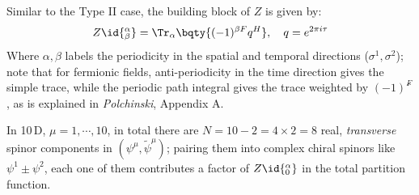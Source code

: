 \documentclass[a4paper,10pt]{article}
\begin{document}
\begin{enumerate}
\begin{enumerate}
	Similar to the Type II case, the building block of $Z$ is given by:
	\begin{equation}
		Z\id{^\alpha_\beta}
		= \Tr_\alpha \bqty{
				(-1)^{\beta F} q^H
			},\quad
		q = e^{2\pi i\tau}
	\end{equation}
	Where $\alpha,\beta$ labels the periodicity in the spatial and temporal directions ($\sigma^1,\sigma^2$); note that for fermionic fields, anti-periodicity in the time direction gives the simple trace, while the periodic path integral gives the trace weighted by $(−1)^F̂$, as is explained in \textit{Polchinski}, Appendix A. 
	
	In 10\,D, $\mu = 1,\cdots,10$, in total there are $
		N = 10 - 2 = 4\times 2 = 8
	$ real, \textit{transverse} spinor components in $(\psi^\mu,\tilde{\psi}^\mu)$; pairing them into complex chiral spinors like $\psi^1 \pm \psi^2$, each one of them contributes a factor of $Z\id{^\alpha_0}$ in the total partition function. 
	

\end{enumerate}
\end{enumerate}
\end{document}
